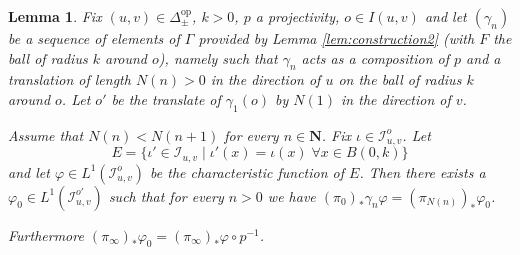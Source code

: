 \documentclass[a4paper, 11pt]{article}
\theoremstyle{plain}
\newtheorem{lemma}[proposition]{Lemma}
\theoremstyle{definition}
\theoremstyle{remark}
\newcommand{\op}{\mathrm{op}}
\newcommand{\IR}{\mathcal I}
\begin{document}
\begin{lemma}\label{lem:detectingfunction}
    Fix $(u,v)\in \Delta_\pm^\op$, $k>0$, $p$ a projectivity, $o\in I(u,v)$ and let $(\gamma_n)$ be a sequence of elements of $\Gamma$ provided by Lemma \ref{lem:construction2} (with $F$ the ball of radius $k$ around $o$), namely such that $\gamma_n$ acts as a composition of $p$ and a translation of length $N(n)>0$ in the direction of $u$ on the ball of radius $k$ around $o$. Let $o'$ be the translate of $\gamma_1(o)$ by $N(1)$ in the direction of $v$.

    Assume that $N(n)<N(n+1)$ for every $n\in\mathbf{N}$. 
    Fix $\iota\in \IR_{u,v}^{o}$. 
    Let $$E=\{\iota'\in \IR_{u,v}\mid \iota'(x)=\iota(x) \;\forall x\in B(0,k)\}
$$ 
and let $\varphi\in L^1(\IR_{u,v}^o)$ be the characteristic function of $E$.  Then there exists a $\varphi_0\in L^1(\IR_{u,v}^{o'})$ such that for every $n>0$ we have
    $(\pi_0)_* \gamma_n \varphi = (\pi_{N(n)})_*\varphi_0$.

    Furthermore $(\pi_\infty)_*\varphi_0=(\pi_\infty)_* \varphi \circ p^{-1}$.

    
\end{lemma}
\end{document}
